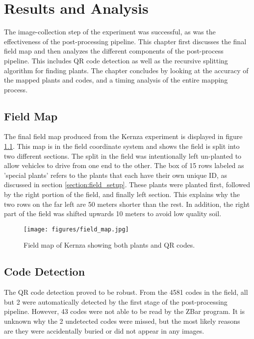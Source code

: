 
\cleardoublepage

\chapter{Results and Analysis}
\label{chapter:results}

The image-collection step of the experiment was successful, as was the effectiveness of the post-processing pipeline.  This chapter first discusses the final field map and then analyzes the different components of the post-process pipeline.  This includes QR code detection as well as the recursive splitting algorithm for finding plants.  The chapter concludes by looking at the accuracy of the mapped plants and codes, and a timing analysis of the entire mapping process.

\section{Field Map}

The final field map produced from the Kernza experiment is displayed in figure \ref{figure:field_map}.  This map is in the field coordinate system and shows the field is split into two different sections.  The split in the field was intentionally left un-planted to allow vehicles to drive from one end to the other.   The box of 15 rows labeled as 'special plants' refers to the plants that each have their own unique ID, as discussed in section \ref{section:field_setup}.  These plants were planted first, followed by the right portion of the field, and finally left section.  This explains why the two rows on the far left are 50 meters shorter than the rest. In addition, the right part of the field was shifted upwards 10 meters to avoid low quality soil.

\begin{figure}[htb]
	\centering
    \texttt{[image: figures/field\_map.jpg]}
    \caption[Field map]{Field map of Kernza showing both plants and QR codes.}
    \label{figure:field_map}
\end{figure}

\section{Code Detection}

The QR code detection proved to be robust. From the 4581 codes in the field, all but 2 were automatically detected by the first stage of the post-processing pipeline.  However, 43 codes were not able to be read by the ZBar program.  It is unknown why the 2 undetected codes were missed, but the most likely reasons are they were accidentally buried or did not appear in any images.  

